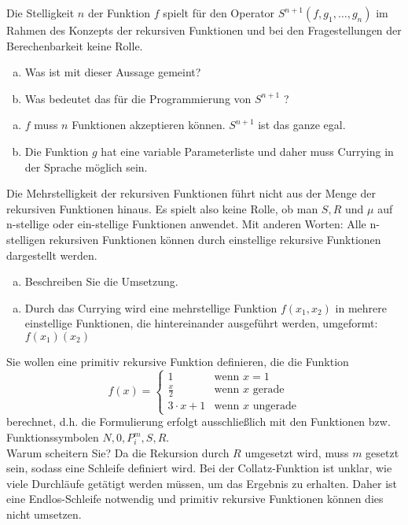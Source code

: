 \begin{card}
  Die Stelligkeit $n$ der Funktion $f$ spielt für den Operator $S^{n+1}(f, g_1, \ldots, g_n)$ im Rahmen des Konzepts der rekursiven Funktionen und bei den Fragestellungen der Berechenbarkeit keine Rolle.
  \begin{enumerate}[a)]
    \item Was ist mit dieser Aussage gemeint?
    \item Was bedeutet das für die Programmierung von $S^{n+1}$ ?
  \end{enumerate}
  \hr
  \begin{enumerate}[a)]
    \item $f$ muss $n$ Funktionen akzeptieren können. $S^{n+1}$ ist das ganze egal.
    \item Die Funktion $g$ hat eine variable Parameterliste und daher muss Currying in der Sprache möglich sein.
  \end{enumerate}
\end{card}

\begin{card}
  Die Mehrstelligkeit der rekursiven Funktionen führt nicht aus der Menge der rekursiven Funktionen hinaus. Es spielt also keine Rolle, ob man $S, R$ und $\mu$ auf n-stellige oder ein-stellige Funktionen anwendet. Mit anderen Worten: Alle n-stelligen rekursiven Funktionen können durch einstellige rekursive Funktionen dargestellt werden.
  \begin{enumerate}[a)]
    \item Beschreiben Sie die Umsetzung.
  \end{enumerate}
  \hr
  \begin{enumerate}[a)]
    \item Durch das Currying wird eine mehrstellige Funktion $f(x_1, x_2)$ in mehrere einstellige Funktionen, die
      hintereinander ausgeführt werden, umgeformt: $f(x_1)(x_2)$
  \end{enumerate}
\end{card}

\begin{card}
	Sie wollen eine primitiv rekursive Funktion definieren, die die Funktion
	\[
	f(x) =
	\begin{cases}
	1 & \text{wenn $x = 1$} \\
	  \frac{x}{2} & \text{wenn $x$ gerade} \\
	3 \cdot x + 1 &\text{wenn $x$ ungerade}
	\end{cases}
	\]
	berechnet, d.h. die Formulierung erfolgt ausschließlich mit den Funktionen bzw. Funktionssymbolen $N, 0, P^m_i , S, R$.\\
	Warum scheitern Sie?
  \hr
	Da die Rekursion durch $R$ umgesetzt wird, muss $m$ gesetzt sein, sodass eine Schleife definiert wird. Bei der Collatz-Funktion ist unklar, wie viele Durchläufe getätigt werden müssen, um das Ergebnis zu erhalten. Daher ist eine Endlos-Schleife notwendig und primitiv rekursive Funktionen können dies nicht umsetzen.
\end{card}

